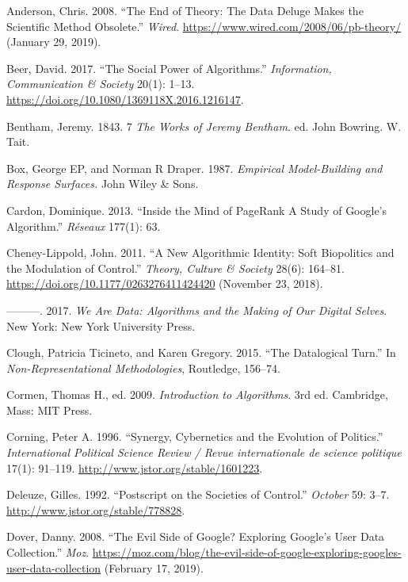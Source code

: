 \documentclass[12pt,twoside]{report}
\begin{document}
\leavevmode\hypertarget{ref-Anderson2008}{}%
Anderson, Chris. 2008. ``The End of Theory: The Data Deluge Makes the Scientific Method Obsolete.'' \emph{Wired}. \url{https://www.wired.com/2008/06/pb-theory/} (January 29, 2019).

\leavevmode\hypertarget{ref-Beer2017}{}%
Beer, David. 2017. ``The Social Power of Algorithms.'' \emph{Information, Communication \& Society} 20(1): 1--13. \url{https://doi.org/10.1080/1369118X.2016.1216147}.

\leavevmode\hypertarget{ref-Bentham1843}{}%
Bentham, Jeremy. 1843. 7 \emph{The Works of Jeremy Bentham}. ed. John Bowring. W. Tait.

\leavevmode\hypertarget{ref-Box1987}{}%
Box, George EP, and Norman R Draper. 1987. \emph{Empirical Model-Building and Response Surfaces.} John Wiley \& Sons.

\leavevmode\hypertarget{ref-Cardon2013}{}%
Cardon, Dominique. 2013. ``Inside the Mind of PageRank A Study of Google's Algorithm.'' \emph{Réseaux} 177(1): 63.

\leavevmode\hypertarget{ref-Cheney2011}{}%
Cheney-Lippold, John. 2011. ``A New Algorithmic Identity: Soft Biopolitics and the Modulation of Control.'' \emph{Theory, Culture \& Society} 28(6): 164--81. \url{https://doi.org/10.1177/0263276411424420} (November 23, 2018).

\leavevmode\hypertarget{ref-Cheney2017}{}%
---------. 2017. \emph{We Are Data: Algorithms and the Making of Our Digital Selves}. New York: New York University Press.

\leavevmode\hypertarget{ref-Clough2015}{}%
Clough, Patricia Ticineto, and Karen Gregory. 2015. ``The Datalogical Turn.'' In \emph{Non-Representational Methodologies}, Routledge, 156--74.

\leavevmode\hypertarget{ref-Cormen2009}{}%
Cormen, Thomas H., ed. 2009. \emph{Introduction to Algorithms}. 3rd ed. Cambridge, Mass: MIT Press.

\leavevmode\hypertarget{ref-Corning1996}{}%
Corning, Peter A. 1996. ``Synergy, Cybernetics and the Evolution of Politics.'' \emph{International Political Science Review / Revue internationale de science politique} 17(1): 91--119. \url{http://www.jstor.org/stable/1601223}.

\leavevmode\hypertarget{ref-Deleuze1992}{}%
Deleuze, Gilles. 1992. ``Postscript on the Societies of Control.'' \emph{October} 59: 3--7. \url{http://www.jstor.org/stable/778828}.

\leavevmode\hypertarget{ref-Dover2008}{}%
Dover, Danny. 2008. ``The Evil Side of Google? Exploring Google's User Data Collection.'' \emph{Moz}. \url{https://moz.com/blog/the-evil-side-of-google-exploring-googles-user-data-collection} (February 17, 2019).
\end{document}
